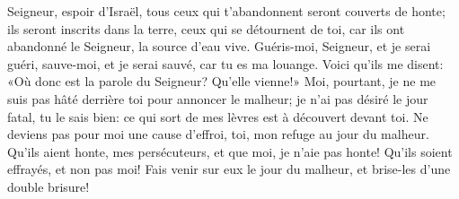 Seigneur, espoir d’Israël,
	tous ceux qui t’abandonnent seront couverts de honte;
	ils seront inscrits dans la terre, ceux qui se détournent de toi,
	car ils ont abandonné le Seigneur, la source d’eau vive.
Guéris-moi, Seigneur, et je serai guéri,
	sauve-moi, et je serai sauvé, car tu es ma louange.
Voici qu’ils me disent:
	«Où donc est la parole du Seigneur? Qu’elle vienne!»
Moi, pourtant, je ne me suis pas hâté derrière toi pour annoncer le malheur;
	je n’ai pas désiré le jour fatal, tu le sais bien:
	ce qui sort de mes lèvres est à découvert devant toi.
Ne deviens pas pour moi une cause d’effroi,
	toi, mon refuge au jour du malheur.
Qu’ils aient honte, mes persécuteurs, et que moi, je n’aie pas honte!
	Qu’ils soient effrayés, et non pas moi!
	Fais venir sur eux le jour du malheur, et brise-les d’une double brisure!
